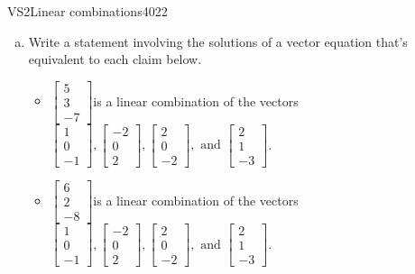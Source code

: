 \begin{exercise}{VS2}{Linear combinations}{4022} 
\begin{exerciseStatement} 

\begin{enumerate}[(a)]
\item  

 Write a statement involving the solutions of a vector equation that's equivalent to each claim below. 

 

\begin{itemize}
\item  

 \(\left[\begin{array}{c}
5 \\
3 \\
-7
\end{array}\right]\)is a linear combination of the vectors \(\left[\begin{array}{c}
1 \\
0 \\
-1
\end{array}\right] , \left[\begin{array}{c}
-2 \\
0 \\
2
\end{array}\right] , \left[\begin{array}{c}
2 \\
0 \\
-2
\end{array}\right] , \text{ and } \left[\begin{array}{c}
2 \\
1 \\
-3
\end{array}\right]\). 

 
\item  

 \(\left[\begin{array}{c}
6 \\
2 \\
-8
\end{array}\right]\)is a linear combination of the vectors \(\left[\begin{array}{c}
1 \\
0 \\
-1
\end{array}\right] , \left[\begin{array}{c}
-2 \\
0 \\
2
\end{array}\right] , \left[\begin{array}{c}
2 \\
0 \\
-2
\end{array}\right] , \text{ and } \left[\begin{array}{c}
2 \\
1 \\
-3
\end{array}\right]\). 


\end{itemize}
\end{enumerate}
\end{exerciseStatement}
\end{exercise}
